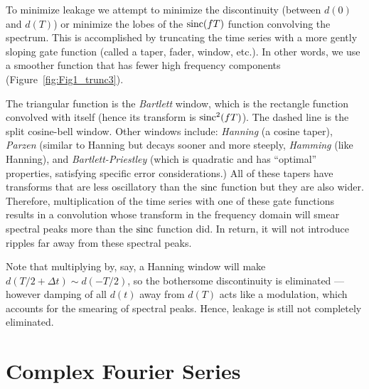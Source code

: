 	To minimize leakage we attempt to minimize the discontinuity (between $d(0)$ and $d(T)$) or 
minimize the lobes of the $\operatorname{sinc} (fT)$ function convolving the spectrum.  This is accomplished by 
truncating the time series with a more gently sloping gate function (called a taper, fader, window, 
etc.). In other words, we use a smoother function that has fewer high frequency components (Figure~\ref{fig:Fig1_trunc3}).

\noindent
{}
The triangular function is the \emph{Bartlett} window, which is the rectangle function convolved with 
itself (hence its transform is $\operatorname{sinc}^2 (fT)$).  The dashed line is the split cosine-bell window.  Other 
windows include:  \emph{Hanning} (a cosine taper), \emph{Parzen} (similar to Hanning but decays sooner and  
more steeply, \emph{Hamming} (like Hanning), and \emph{Bartlett-Priestley} (which is quadratic and has ``optimal'' properties, 
satisfying specific error considerations.)  All of these tapers have transforms that are less 
oscillatory than the $\operatorname{sinc}$ function but they are also wider. Therefore, multiplication of the time series with one 
of these gate functions results in a convolution whose transform in the frequency domain will smear spectral peaks 
more than the $\operatorname{sinc}$ function did. In return, it will not introduce ripples far away from these spectral peaks.

	Note that multiplying by, say, a Hanning window will make $d(T/2+\Delta t) \sim d(-T/2)$, so 
the bothersome discontinuity is eliminated --- however damping of all $d(t)$ away from $d(T)$ acts like a modulation, 
which accounts for the smearing of spectral peaks. Hence, leakage is still not completely eliminated.

\section{Complex Fourier Series}

